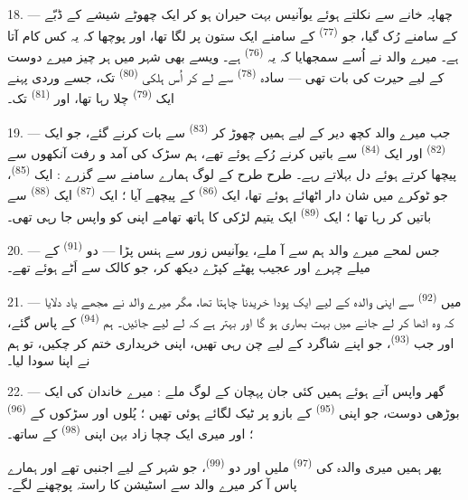 \VUsaut{3.0mm}

18. --- چھاپہ خانے سے نکلتے ہوئے یوآنیس بہت حیران ہو کر ایک چھوٹے
شیشے کے ڈبّے کے سامنے رُک گیا، جو 
\textsuperscript{(77)} کے سامنے ایک ستون پر لگا تھا، اور پوچھا کہ یہ
کس کام آتا ہے۔ میرے والد نے اُسے سمجھایا کہ یہ  \textsuperscript{(76)} ہے۔ ویسے بھی شہر میں ہر چیز میرے دوست کے
لیے حیرت کی بات تھی — سادہ 
\textsuperscript{(78)} سے لے کر اُس ہلکی  \textsuperscript{(80)} تک، جسے وردی پہنے ایک 
\textsuperscript{(79)} چلا رہا تھا، اور 
\textsuperscript{(81)} تک۔

19. --- جب میرے والد کچھ دیر کے لیے ہمیں چھوڑ کر 
\textsuperscript{(83)} سے بات کرنے گئے، جو ایک 
\textsuperscript{(82)} اور ایک  \textsuperscript{(84)} سے
باتیں کرنے رُکے ہوئے تھے، ہم سڑک کی آمد و رفت آنکھوں سے پیچھا کرتے
ہوئے دل بہلاتے رہے۔ طرح طرح کے لوگ ہمارے سامنے سے گزرے : ایک
 \textsuperscript{(85)}، جو ٹوکرے میں شان دار
 اٹھائے ہوئے تھا، ایک 
\textsuperscript{(86)} کے پیچھے آیا ؛ ایک 
\textsuperscript{(87)} ایک  \textsuperscript{(88)} سے
باتیں کر رہا تھا ؛ ایک  \textsuperscript{(89)} ایک
یتیم لڑکی کا ہاتھ تھامے اپنی  کو واپس جا رہی تھی۔

\VUsaut{3.0mm}

20. --- جس لمحے میرے والد ہم سے آ ملے، یوآنیس زور سے ہنس پڑا — دو
 \textsuperscript{(91)} کے میلے چہرے اور
عجیب پھٹے کپڑے دیکھ کر، جو کالک سے اَٹے ہوئے تھے۔

21. --- میں  \textsuperscript{(92)} سے اپنی والدہ کے
لیے ایک پودا خریدنا چاہتا تھا، مگر میرے والد نے مجھے یاد دلایا کہ وہ
اٹھا کر لے جانے میں بہت بھاری ہو گا اور بہتر ہے کہ 
لے لیے جائیں۔ ہم  \textsuperscript{(94)} کے پاس
گئے، اور جب  \textsuperscript{(93)}، جو اپنے
شاگرد کے لیے چن رہی تھیں، اپنی خریداری ختم کر چکیں، تو ہم نے اپنا
سودا لیا۔

22. --- گھر واپس آتے ہوئے ہمیں کئی جان پہچان کے لوگ ملے : میرے خاندان
کی ایک بوڑھی دوست، جو اپنی 
\textsuperscript{(95)} کے بازو پر ٹیک لگائے ہوئی تھیں ؛ پُلوں اور
سڑکوں کے  \textsuperscript{(96)} ؛ اور میری ایک چچا
زاد بہن اپنی  \textsuperscript{(98)} کے ساتھ۔

پھر ہمیں میری والدہ کی  \textsuperscript{(97)}
ملیں اور دو  \textsuperscript{(99)}، جو شہر کے لیے اجنبی
تھے اور ہمارے پاس آ کر میرے والد سے اسٹیشن کا راستہ پوچھنے لگے۔

\VUsaut{6.0mm}
\VUfilet{22mm}
